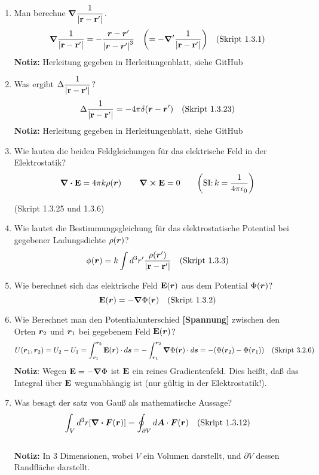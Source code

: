 \begin{enumerate}
  \item Man berechne $\displaystyle \grad\frac{1}{\abs{\vb{r}-\vb{r}'}}$.
        $$\displaystyle \grad\frac{1}{\abs{\vb{r}-\vb{r}'}}=
         -\frac{\vb* r -\vb* r'}{\abs{\vb* r - \vb* r'}^3}\quad
         \qty(=-\grad'\frac{1}{\abs{\vb{r}-\vb{r}'}})\quad\text{(Skript 1.3.1)}$$ 
    \textbf{Notiz:} Herleitung gegeben in Herleitungenblatt, siehe GitHub

  \item Was ergibt $\displaystyle \Delta\frac{1}{\abs{\vb{r}-\vb{r}'}}$?
        $$\displaystyle \Delta \frac{1}{\abs{\vb{r}-\vb{r}'}} = -4\pi \delta(\vb* r-\vb* r')
        \quad\text{(Skript 1.3.23)}$$
    \textbf{Notiz:} Herleitung gegeben in Herleitungenblatt, siehe GitHub
    
  \item Wie lauten die beiden Feldgleichungen für das 
        elektrische Feld in der Elektrostatik?
        $$\displaystyle \div \vb E=4\pi k\rho(\vb* r)\,\qquad\curl\vb E=0
         \qquad\qty(\text{SI:}\,k=\frac{1}{4\pi\epsilon_0})$$
        \begin{center}
          (Skript 1.3.25 und 1.3.6)
        \end{center}
  
  \item Wie lautet die Bestimmungsgleichung für das elektrostatische 
        Potential bei gegebener Ladungsdichte $\rho(\vb* r)$?
        $$\phi(\vb* r)=k\int d^3r'\frac{\rho(\vb* r')}{\abs{\vb{r}-\vb{r}'}}
        \quad\text{(Skript 1.3.3)}$$

  \item Wie berechnet sich das elektrische Feld $\vb E (\vb* r)$ aus dem
        Potential $\Phi(\vb* r)$?
        $$\displaystyle \vb E(\vb* r) = - \grad \Phi (\vb* r)
        \quad\text{(Skript 1.3.2)}$$

  \item Wie Berechnet man den Potentialunterschied \textbf{[Spannung]}
        zwischen den Orten 
        $\vb* r_2$ und $\vb* r_1$ bei gegebenem Feld $\vb E(\vb* r)$?
        $$\displaystyle U(\vb* r_1, \vb* r_2)=U_2-U_1
         =\int_{\vb* r_1}^{\vb* r_2} \vb E(\vb* r)\cdot d\vb* s
         =-\int_{\vb* r_1}^{\vb* r_2} \grad \Phi (\vb* r)\cdot d\vb* s
         =-\qty(\Phi(\vb* r_2)-\Phi(\vb* r_1))
         \quad\text{(Skript 3.2.6)}$$
        \textbf{Notiz}: Wegen $\vb E=-\grad\Phi$ ist $\vb E$ ein reines
        Gradientenfeld. Dies heißt, daß das Integral über $\vb E$
        wegunabhängig ist (nur gültig in der Elektrostatik!).

  \item Was besagt der satz von Gauß als mathematische Aussage?
        $$\displaystyle \int_V d^3r \qty[\div \vb* F(\vb* r)]=
         \oint_{\partial V}d\vb* A\cdot \vb* F(\vb* r)
         \quad\text{(Skript 1.3.12)}$$\\
        \textbf{Notiz:} In 3 Dimensionen, wobei $V$ ein Volumen darstellt,
        und $\partial V$ dessen Randfläche darstellt.


\end{enumerate}
